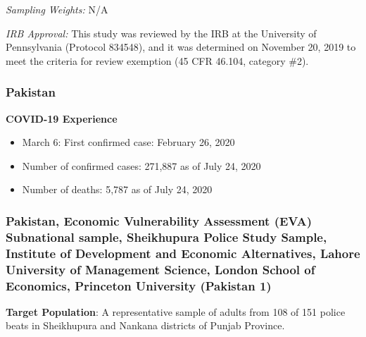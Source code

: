 \documentclass[
  12pt,
]{article}
\begin{document}
\emph{Sampling Weights:} N/A

\emph{IRB Approval:} This study was reviewed by the IRB at the University of Pennsylvania (Protocol 834548), and it was determined on November 20, 2019 to meet the criteria for review exemption (45 CFR 46.104, category \#2).

\hypertarget{pakistan}{%
\subsubsection*{Pakistan}\label{pakistan}}

\textbf{COVID-19 Experience}

\begin{itemize}
\item March 6: First confirmed case: February  26, 2020 
\item Number of confirmed cases:  271,887 as of July 24, 2020 
\item Number of deaths:  5,787 as of July 24, 2020 
\end{itemize}

\hypertarget{pakistan-economic-vulnerability-assessment-eva-subnational-sample-sheikhupura-police-study-sample-institute-of-development-and-economic-alternatives-lahore-university-of-management-science-london-school-of-economics-princeton-university-pakistan-1}{%
\subsubsection*{Pakistan, Economic Vulnerability Assessment (EVA) Subnational sample, Sheikhupura Police Study Sample, Institute of Development and Economic Alternatives, Lahore University of Management Science, London School of Economics, Princeton University (Pakistan 1)}\label{pakistan-economic-vulnerability-assessment-eva-subnational-sample-sheikhupura-police-study-sample-institute-of-development-and-economic-alternatives-lahore-university-of-management-science-london-school-of-economics-princeton-university-pakistan-1}}

\textbf{Target Population}: A representative sample of adults from 108 of 151 police beats in Sheikhupura and Nankana districts of Punjab Province.
\end{document}
